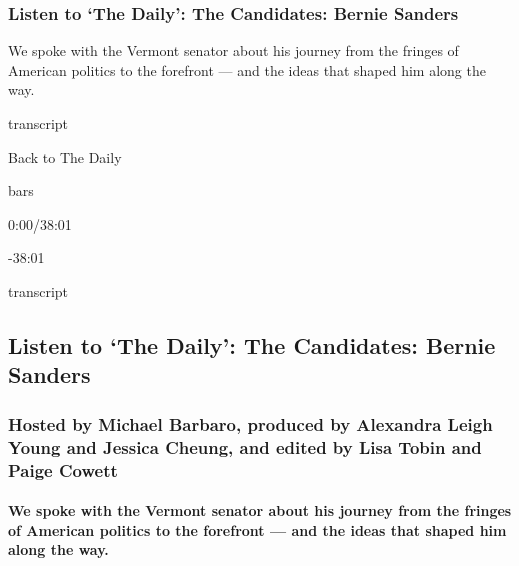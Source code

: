 \hypertarget{listen-to-the-daily-the-candidates-bernie-sanders}{%
\subsubsection{Listen to `The Daily': The Candidates: Bernie
Sanders}\label{listen-to-the-daily-the-candidates-bernie-sanders}}

We spoke with the Vermont senator about his journey from the fringes of
American politics to the forefront --- and the ideas that shaped him
along the way.

transcript

Back to The Daily

bars

0:00/38:01

-38:01

transcript

\hypertarget{listen-to-the-daily-the-candidates-bernie-sanders-1}{%
\subsection{Listen to `The Daily': The Candidates: Bernie
Sanders}\label{listen-to-the-daily-the-candidates-bernie-sanders-1}}

\hypertarget{hosted-by-michael-barbaro-produced-by-alexandra-leigh-young-and-jessica-cheung-and-edited-by-lisa-tobin-and-paige-cowett}{%
\subsubsection{Hosted by Michael Barbaro, produced by Alexandra Leigh
Young and Jessica Cheung, and edited by Lisa Tobin and Paige
Cowett}\label{hosted-by-michael-barbaro-produced-by-alexandra-leigh-young-and-jessica-cheung-and-edited-by-lisa-tobin-and-paige-cowett}}

\hypertarget{we-spoke-with-the-vermont-senator-about-his-journey-from-the-fringes-of-american-politics-to-the-forefront--and-the-ideas-that-shaped-him-along-the-way}{%
\paragraph{We spoke with the Vermont senator about his journey from the
fringes of American politics to the forefront --- and the ideas that
shaped him along the
way.}\label{we-spoke-with-the-vermont-senator-about-his-journey-from-the-fringes-of-american-politics-to-the-forefront--and-the-ideas-that-shaped-him-along-the-way}}

